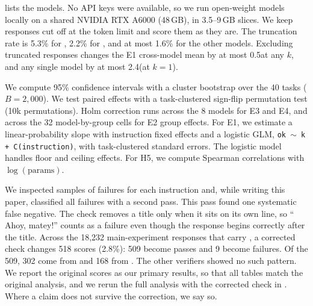   lists the models. No API keys were available, so we run open-weight models locally on a shared NVIDIA RTX A6000 (48\,GB), in 3.5--9\,GB slices. We keep responses cut off at the token limit and score them as they are. The truncation rate is 5.3\% for \qhalf, 2.2\% for \qone, and at most 1.6\% for the other models. Excluding truncated responses changes the E1 cross-model mean by at most 0.5\pp at any $k$, and any single model by at most 2.4\pp (\qhalf at $k=1$).



 We compute 95\% confidence intervals with a cluster bootstrap over the 40 tasks ($B=2{,}000$). We test paired effects with a task-clustered sign-flip permutation test (10k permutations). Holm correction runs across the 8 models for E3 and E4, and across the 32 model-by-group cells for E2 group effects. For E1, we estimate a linear-probability slope with instruction fixed effects and a logistic GLM, \texttt{ok $\sim$ k + C(instruction)}, with task-clustered standard errors. The logistic model handles floor and ceiling effects. For H5, we compute Spearman correlations with $\log(\text{params})$.

 We inspected samples of failures for each instruction and, while writing this paper, classified all failures with a second pass. This pass found one systematic false negative. The  check removes a title only when it sits on its own line, so `` Ahoy, matey!'' counts as a failure even though the response begins correctly after the title. Across the 18,232 main-experiment responses that carry , a corrected check changes 518 scores (2.8\%): 509 become passes and 9 become failures. Of the 509, 302 come from \qthree and 168 from \lone. The other verifiers showed no such pattern. We report the original scores as our primary results, so that all tables match the original analysis, and we rerun the full analysis with the corrected check in . Where a claim does not survive the correction, we say so.
